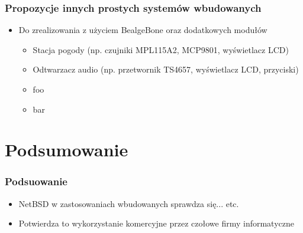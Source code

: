 \documentclass[dvipsnames,table]{beamer}
\begin{document}
\begin{frame}
\frametitle{Propozycje innych prostych systemów wbudowanych}
\begin{itemize}
	\item Do zrealizowania z użyciem BealgeBone oraz dodatkowych modułów
	\begin{itemize}
		\item Stacja pogody (np. czujniki MPL115A2, MCP9801, wyświetlacz LCD)
		\item Odtwarzacz audio (np. przetwornik TS4657, wyświetlacz LCD, przyciski)
		\item foo
		\item bar
	\end{itemize}
\end{itemize}
\end{frame}


\section{Podsumowanie}

\begin{frame}
\frametitle{Podsuowanie}
\begin{itemize}
	\item NetBSD w zastosowaniach wbudowanych sprawdza się... etc.
	\item Potwierdza to wykorzystanie komercyjne przez czołowe firmy informatyczne
\end{itemize}
\end{frame}
\end{document}
